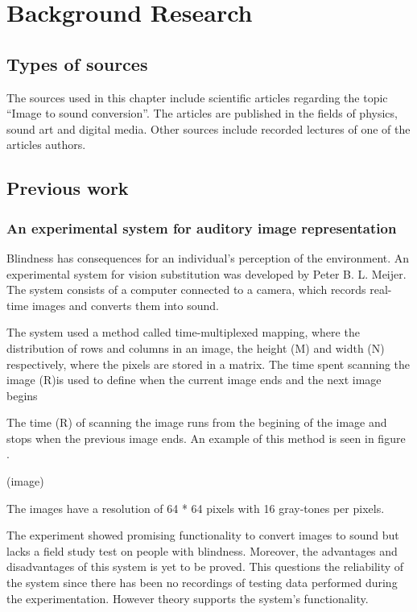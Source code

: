 \chapter{Background Research}\label{ch:bgresearch}



\section{Types of sources}\label{sec:typesofsources} 
The sources used in this chapter include scientific articles regarding the topic “Image to sound conversion”. The articles are published in the fields of physics, sound art and digital media. Other sources include recorded lectures of one of the articles authors.

\section{Previous work}\label{sec:previouswork}

\subsection{An experimental system for auditory image representation}\label{sec:experimentalsystem}
Blindness has consequences for an individual's perception of the environment. An experimental system for vision substitution was developed by Peter B. L. Meijer. The system consists of a computer connected to a camera, which records real-time images and converts them into sound. 

The system used a method called time-multiplexed mapping, where the distribution of rows and columns in an image, the height (M) and width (N) respectively, where the pixels are stored in a matrix. The time spent scanning the image (R)is used to define when the current image ends and the next image begins


The time (R) of scanning the image runs from the begining of the image and stops when the previous image ends. An example of this method is seen in figure . 

(image)
  
The images have a resolution of 64 * 64 pixels with 16 gray-tones per pixels.  

The experiment showed promising functionality to convert images to sound but lacks a field study test on people with blindness. Moreover, the advantages and disadvantages of this system is yet to be proved. This questions the reliability of the system since there has been no recordings of testing data performed during the experimentation. However theory supports the system's functionality. 

